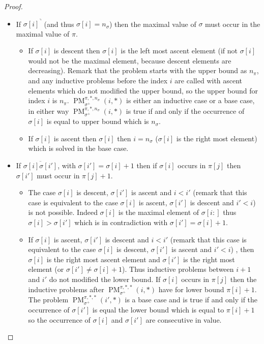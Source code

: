 \documentclass[a4paper]{llncs}
\newcommand{\ptext}{\pi}
\newcommand{\pmotif}{\sigma}
\newcommand{\pbmotif}{\pmotif^+}
\DeclareMathOperator{\PMa}{PM}
\newcommand{\PM}[6]{\PMa_{{#1}}^{{#2},{#3},{#4}}({#5},{#6})}
\begin{document}
\begin{proof}
\begin{itemize}
	
	\item If ${\pmotif[i]}^\urcorner$ (and thus $\sigma[i]=n_\pmotif$) then the maximal value of $\pmotif$ must occur in the maximal value of $\ptext$.
	\begin{itemize}
		\item If $\sigma[i]$ is descent then $\sigma[i]$ is the left most ascent element (if not $\sigma[i]$ would not be the maximal element, because descent elements are decreasing). Remark that the problem starts with the upper bound as $n_\ptext$, and any inductive problems before the index $i$ are called with ascent elements which do not modified the upper bound, so the upper bound for index $i$ is $n_\ptext$. 		$\PM{\pbmotif}{\ptext}{*}{n_\pmotif}{i}{*}$ is either an inductive case or a base case, in either way  $\PM{\pbmotif}{\ptext}{*}{n_\pmotif}{i}{*}$ is true if and only if the occurrence of $\sigma[i]$ is equal to upper bound which is  $n_\pmotif$.
		
		
		\item If $\sigma[i]$ is ascent then $\sigma[i]$ then $i=n_\pmotif$ ($\sigma[i]$ is the right most element) which is solved in the base case.
	\end{itemize}
	
	  
	
	\item  If $\overline{\pmotif[i]\pmotif[i']}$, with $\pmotif[i']=\pmotif[i]+1$ then if $\pmotif[i]$ occurs in $\ptext[j]$ then $\pmotif[i']$ must occur in $\ptext[j]+1$. 
		\begin{itemize}
			\item The case $\pmotif[i]$ is descent, $\pmotif[i']$ is ascent and $i<i'$ (remark that this case is equivalent to the case $\pmotif[i]$ is ascent, $\pmotif[i']$ is descent and $i'<i$) is not possible. 
			Indeed $\pmotif[i]$ is the maximal element of $\pmotif[i:]$ thus $\pmotif[i] > \pmotif[i']$ which is in contradiction with 
			$\pmotif[i']=\pmotif[i]+1$. 
			
			\item If $\pmotif[i]$ is ascent, $\pmotif[i']$ is descent and $i<i'$ (remark that this case is equivalent to the case $\pmotif[i]$ is descent, $\pmotif[i']$ is ascent and $i'<i$) , then
			$\pmotif[i]$ is the right most ascent element and $\pmotif[i']$ is the right most element (or $\pmotif[i'] \neq \pmotif[i]+1$). Thus inductive problems between $i+1$ and $i'$ do not modified the lower bound. If $\sigma[i]$ occurs in $\ptext[j]$ then the inductive problems after $\PM{\pbmotif}{\ptext}{*}{*}{i}{*}$ have for lower bound $\ptext[i]+1$. The problem $\PM{\pbmotif}{\ptext}{*}{*}{i'}{*}$ is a base case and is true if and only if
			the occurrence of $\sigma[i']$ is equal the lower bound which is equal to $\ptext[i]+1$ so the occurrence of $\pmotif[i]$ and $\pmotif[i']$ are consecutive in value.
				

\end{itemize}
\end{itemize}
\end{proof}
\end{document}
